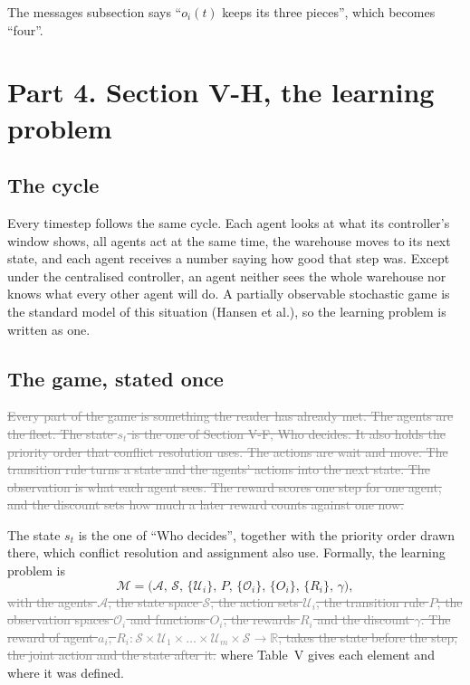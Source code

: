 \documentclass[11pt,a4paper]{article}
\newcommand{\new}[1]{\textcolor{newc}{#1}}
\newcommand{\old}[1]{\textcolor{gray}{\sout{#1}}}
\begin{document}
The messages subsection says ``$o_i(t)$ keeps its three pieces'', which
becomes ``\new{four}''.

\section*{Part 4. Section V-H, the learning problem}

\subsection*{The cycle}
Every timestep follows the same cycle. Each agent looks at what its
controller's window shows, all agents act at the same time, the warehouse
moves to its next state, and each agent receives a number saying how good
that step was. Except under the centralised controller, an agent neither sees
the whole warehouse nor knows what every other agent will do. A partially
observable stochastic game is the standard model of this situation
(Hansen et al.), so the learning problem is written as one.

\subsection*{The game, stated once}
\old{Every part of the game is something the reader has already met. The
agents are the fleet. The state $s_t$ is the one of Section V-F, Who decides.
It also holds the priority order that conflict resolution uses. The actions
are wait and move. The transition rule turns a state and the agents' actions
into the next state. The observation is what each agent sees. The reward
scores one step for one agent, and the discount sets how much a later reward
counts against one now.}

\new{The state $s_t$ is the one of ``Who decides'', together with the
priority order drawn there, which conflict resolution and assignment also
use.} Formally, the learning problem is
\[
  \mathcal{M} = \bigl( \mathcal{A},\, \mathcal{S},\, \{\mathcal{U}_i\},\, P,\,
  \{\mathcal{O}_i\},\, \{O_i\},\, \{R_i\},\, \gamma \bigr), \tag{24}
\]
\old{with the agents $\mathcal{A}$, the state space $\mathcal{S}$, the action
sets $\mathcal{U}_i$, the transition rule $P$, the observation spaces
$\mathcal{O}_i$ and functions $O_i$, the rewards $R_i$ and the discount
$\gamma$. The reward of agent $a_i$, $R_i : \mathcal{S} \times \mathcal{U}_1
\times \dots \times \mathcal{U}_m \times \mathcal{S} \to \mathbb{R}$, takes the
state before the step, the joint action and the state after it.}
\new{where Table~V gives each element and where it was defined.}
\end{document}
